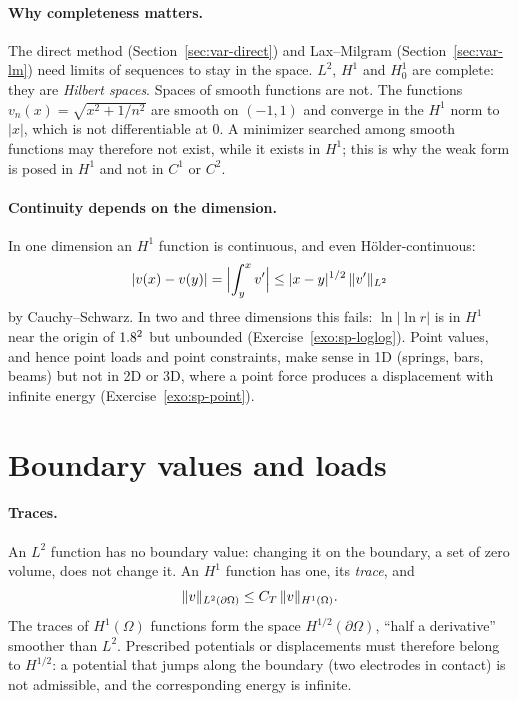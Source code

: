 \paragraph{Why completeness matters.}
%
The direct method (Section~\ref{sec:var-direct}) and Lax--Milgram
(Section~\ref{sec:var-lm}) need limits of sequences to stay in the space.
$L^2$, $H^1$ and $H^1_0$ are complete: they are \emph{Hilbert spaces}.
Spaces of smooth functions are not. The functions
$v_n(x)=\sqrt{x^2+1/n^2}$ are smooth on $(-1,1)$ and converge in the $H^1$ norm
to $|x|$, which is not differentiable at $0$. A minimizer searched among
smooth functions may therefore not exist, while it exists in $H^1$; this is
why the weak form is posed in $H^1$ and not in $C^1$ or $C^2$.

\paragraph{Continuity depends on the dimension.}
%
In one dimension an $H^1$ function is continuous, and even
H\"older-continuous:
\[
  |v(x)-v(y)|=\Bigl|\int_y^xv'\Bigr|\le|x-y|^{1/2}\,\lVert v'\rVert_{L^2}
\]
by Cauchy--Schwarz. In two and three dimensions this fails: $\ln|\ln r|$ is in
$H^1$ near the origin of $1.8^2$ but unbounded (Exercise~\ref{exo:sp-loglog}).
Point values, and hence point loads and point constraints, make sense in 1D
(springs, bars, beams) but not in 2D or 3D, where a point force produces a
displacement with infinite energy (Exercise~\ref{exo:sp-point}).

\section{Boundary values and loads}\label{sec:sp-traces}
\paragraph{Traces.}
%
An $L^2$ function has no boundary value: changing it on the boundary, a set of
zero volume, does not change it. An $H^1$ function has one, its \emph{trace},
and
\[
  \lVert v\rVert_{L^2(\partial\Omega)}\le C_T\,\lVert v\rVert_{H^1(\Omega)} .
\]
The traces of $H^1(\Omega)$ functions form the space $H^{1/2}(\partial\Omega)$,
``half a derivative'' smoother than $L^2$. Prescribed potentials or
displacements must therefore belong to $H^{1/2}$: a potential that jumps
along the boundary (two electrodes in contact) is not admissible, and the
corresponding energy is infinite.


